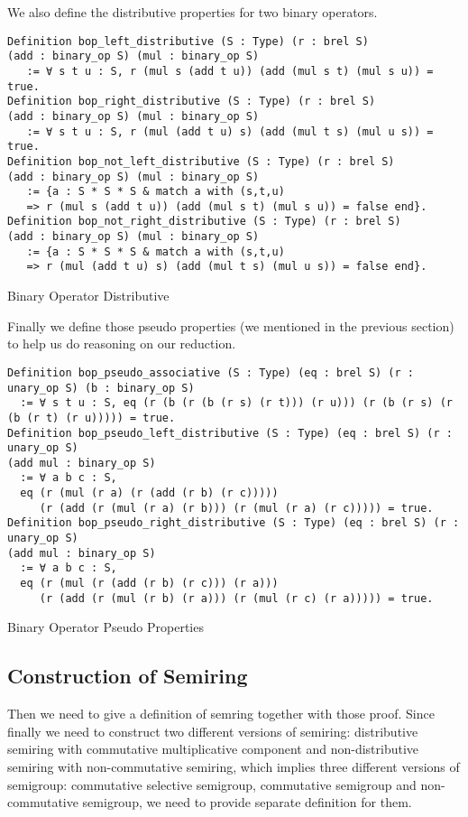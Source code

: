 We also define the distributive properties for two binary operators.
\begin{listing}[H]
\begin{verbatim}
Definition bop_left_distributive (S : Type) (r : brel S) 
(add : binary_op S) (mul : binary_op S) 
   := ∀ s t u : S, r (mul s (add t u)) (add (mul s t) (mul s u)) = true. 
Definition bop_right_distributive (S : Type) (r : brel S) 
(add : binary_op S) (mul : binary_op S) 
   := ∀ s t u : S, r (mul (add t u) s) (add (mul t s) (mul u s)) = true. 
Definition bop_not_left_distributive (S : Type) (r : brel S) 
(add : binary_op S) (mul : binary_op S) 
   := {a : S * S * S & match a with (s,t,u) 
   => r (mul s (add t u)) (add (mul s t) (mul s u)) = false end}. 
Definition bop_not_right_distributive (S : Type) (r : brel S) 
(add : binary_op S) (mul : binary_op S) 
   := {a : S * S * S & match a with (s,t,u) 
   => r (mul (add t u) s) (add (mul t s) (mul u s)) = false end}.
\end{verbatim}
\caption{Binary Operator Distributive} 
\label{coq:def:binary_properties_distributive}
\end{listing}

Finally we define those pseudo properties (we mentioned in the previous section) to help us do reasoning on our reduction.

\begin{listing}[H]
\begin{verbatim}
Definition bop_pseudo_associative (S : Type) (eq : brel S) (r : unary_op S) (b : binary_op S) 
  := ∀ s t u : S, eq (r (b (r (b (r s) (r t))) (r u))) (r (b (r s) (r (b (r t) (r u))))) = true.
Definition bop_pseudo_left_distributive (S : Type) (eq : brel S) (r : unary_op S) 
(add mul : binary_op S) 
  := ∀ a b c : S, 
  eq (r (mul (r a) (r (add (r b) (r c))))) 
     (r (add (r (mul (r a) (r b))) (r (mul (r a) (r c))))) = true.          
Definition bop_pseudo_right_distributive (S : Type) (eq : brel S) (r : unary_op S) 
(add mul : binary_op S) 
  := ∀ a b c : S, 
  eq (r (mul (r (add (r b) (r c))) (r a))) 
     (r (add (r (mul (r b) (r a))) (r (mul (r c) (r a))))) = true.

\end{verbatim}
\caption{Binary Operator Pseudo Properties} 
\label{coq:def:binary_properties_pseudo}
\end{listing}

\subsection{Construction of Semiring}
Then we need to give a definition of semring together with those proof. Since finally we need to construct two different versions of semiring: distributive semiring with commutative multiplicative component and non-distributive semiring with non-commutative semiring, which implies three different versions of semigroup: commutative selective semigroup, commutative semigroup and non-commutative semigroup, we need to provide separate definition for them.

